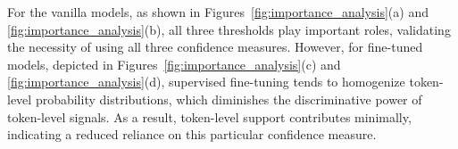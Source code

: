 For the vanilla models, as shown in Figures~\ref{fig:importance_analysis}(a) and \ref{fig:importance_analysis}(b), all three thresholds play important roles, validating the necessity of using all three confidence measures. However, for fine-tuned models, depicted in Figures~\ref{fig:importance_analysis}(c) and \ref{fig:importance_analysis}(d), supervised fine-tuning tends to homogenize token-level probability distributions, which diminishes the discriminative power of token-level signals. As a result, token-level support contributes minimally, indicating a reduced reliance on this particular confidence measure.

